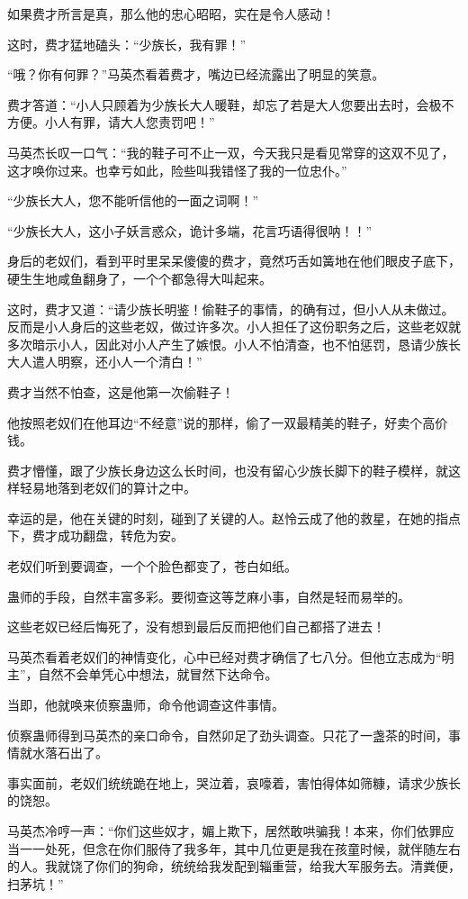 \begin{this_body}
如果费才所言是真，那么他的忠心昭昭，实在是令人感动！

这时，费才猛地磕头：“少族长，我有罪！”

“哦？你有何罪？”马英杰看着费才，嘴边已经流露出了明显的笑意。

费才答道：“小人只顾着为少族长大人暖鞋，却忘了若是大人您要出去时，会极不方便。小人有罪，请大人您责罚吧！”

马英杰长叹一口气：“我的鞋子可不止一双，今天我只是看见常穿的这双不见了，这才唤你过来。也幸亏如此，险些叫我错怪了我的一位忠仆。”

“少族长大人，您不能听信他的一面之词啊！”

“少族长大人，这小子妖言惑众，诡计多端，花言巧语得很呐！！”

身后的老奴们，看到平时里呆呆傻傻的费才，竟然巧舌如簧地在他们眼皮子底下，硬生生地咸鱼翻身了，一个个都急得大叫起来。

这时，费才又道：“请少族长明鉴！偷鞋子的事情，的确有过，但小人从未做过。反而是小人身后的这些老奴，做过许多次。小人担任了这份职务之后，这些老奴就多次暗示小人，因此对小人产生了嫉恨。小人不怕清查，也不怕惩罚，恳请少族长大人遣人明察，还小人一个清白！”

费才当然不怕查，这是他第一次偷鞋子！

他按照老奴们在他耳边“不经意”说的那样，偷了一双最精美的鞋子，好卖个高价钱。

费才懵懂，跟了少族长身边这么长时间，也没有留心少族长脚下的鞋子模样，就这样轻易地落到老奴们的算计之中。

幸运的是，他在关键的时刻，碰到了关键的人。赵怜云成了他的救星，在她的指点下，费才成功翻盘，转危为安。

老奴们听到要调查，一个个脸色都变了，苍白如纸。

蛊师的手段，自然丰富多彩。要彻查这等芝麻小事，自然是轻而易举的。

这些老奴已经后悔死了，没有想到最后反而把他们自己都搭了进去！

马英杰看着老奴们的神情变化，心中已经对费才确信了七八分。但他立志成为“明主”，自然不会单凭心中想法，就冒然下达命令。

当即，他就唤来侦察蛊师，命令他调查这件事情。

侦察蛊师得到马英杰的亲口命令，自然卯足了劲头调查。只花了一盏茶的时间，事情就水落石出了。

事实面前，老奴们统统跪在地上，哭泣着，哀嚎着，害怕得体如筛糠，请求少族长的饶恕。

马英杰冷哼一声：“你们这些奴才，媚上欺下，居然敢哄骗我！本来，你们依罪应当一一处死，但念在你们服侍了我多年，其中几位更是我在孩童时候，就伴随左右的人。我就饶了你们的狗命，统统给我发配到辎重营，给我大军服务去。清粪便，扫茅坑！”


\end{this_body}
